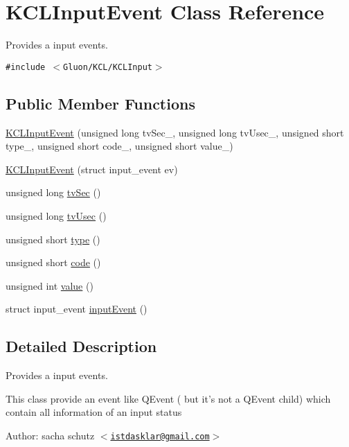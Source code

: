 \hypertarget{class_k_c_l_input_event}{
\section{KCLInputEvent Class Reference}
\label{class_k_c_l_input_event}
}
Provides a input events.  


{\tt \#include $<$Gluon/KCL/KCLInput$>$}

\subsection*{Public Member Functions}
\begin{CompactItemize}
\item 
\hyperlink{class_k_c_l_input_event_c63424ab23ee29d723f5d1c7be5fc611}{KCLInputEvent} (unsigned long tvSec\_\-, unsigned long tvUsec\_\-, unsigned short type\_\-, unsigned short code\_\-, unsigned short value\_\-)
\item 
\hyperlink{class_k_c_l_input_event_6bfdec36c4b9f11bf6146041a42ed38a}{KCLInputEvent} (struct input\_\-event ev)
\item 
unsigned long \hyperlink{class_k_c_l_input_event_e62fcf6dbfebdb826f030a42324f9112}{tvSec} ()
\item 
unsigned long \hyperlink{class_k_c_l_input_event_2bf3d985ad387f9a1afbd998f42072be}{tvUsec} ()
\item 
unsigned short \hyperlink{class_k_c_l_input_event_78e5404404a0874ba2c8272f366f0695}{type} ()
\item 
unsigned short \hyperlink{class_k_c_l_input_event_5221441a9d80302c2c78bbed623b7456}{code} ()
\item 
unsigned int \hyperlink{class_k_c_l_input_event_21b5263ab33ebb4725ffa93f7ededba6}{value} ()
\item 
struct input\_\-event \hyperlink{class_k_c_l_input_event_de2a9323ac2ac739fcb27a3b361fb776}{inputEvent} ()
\end{CompactItemize}


\subsection{Detailed Description}
Provides a input events. 

This class provide an event like QEvent ( but it's not a QEvent child) which contain all information of an input status

\begin{Desc}
\item[Author:]sacha schutz $<$\href{mailto:istdasklar@gmail.com}{\tt istdasklar@gmail.com}$>$ \end{Desc}


